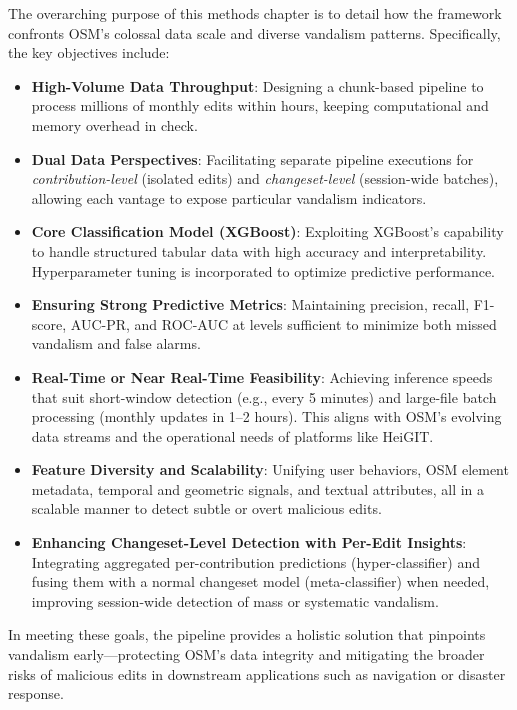 \documentclass[
    13pt, %
    a4paper, %
    DIV14, %
    listof=totoc, %
    bibliography=totoc, %
    index=totoc, %
    headsepline
]{scrreprt}
\begin{document}
The overarching purpose of this methods chapter is to detail how the framework confronts OSM’s colossal data scale and diverse vandalism patterns. Specifically, the key objectives include:

\begin{itemize}
    \item \textbf{High-Volume Data Throughput}:
    Designing a chunk-based pipeline to process millions of monthly edits within hours, keeping computational and memory overhead in check.
    \item \textbf{Dual Data Perspectives}:
    Facilitating separate pipeline executions for \emph{contribution-level} (isolated edits) and \emph{changeset-level} (session-wide batches), allowing each vantage to expose particular vandalism indicators.
    \item \textbf{Core Classification Model (XGBoost)}:
    Exploiting XGBoost’s capability to handle structured tabular data with high accuracy and interpretability. Hyperparameter tuning is incorporated to optimize predictive performance.
    \item \textbf{Ensuring Strong Predictive Metrics}:
    Maintaining precision, recall, F1-score, AUC-PR, and ROC-AUC at levels sufficient to minimize both missed vandalism and false alarms.
    \item \textbf{Real-Time or Near Real-Time Feasibility}:
    Achieving inference speeds that suit short-window detection (e.g., every 5 minutes) and large-file batch processing (monthly updates in 1--2 hours). This aligns with OSM’s evolving data streams and the operational needs of platforms like HeiGIT.
    \item \textbf{Feature Diversity and Scalability}:
    Unifying user behaviors, OSM element metadata, temporal and geometric signals, and textual attributes, all in a scalable manner to detect subtle or overt malicious edits.
    \item \textbf{Enhancing Changeset-Level Detection with Per-Edit Insights}:
    Integrating aggregated per-contribution predictions (hyper-classifier) and fusing them with a normal changeset model (meta-classifier) when needed, improving session-wide detection of mass or systematic vandalism.
\end{itemize}

In meeting these goals, the pipeline provides a holistic solution that pinpoints vandalism early—protecting OSM’s data integrity and mitigating the broader risks of malicious edits in downstream applications such as navigation or disaster response.
\end{document}
